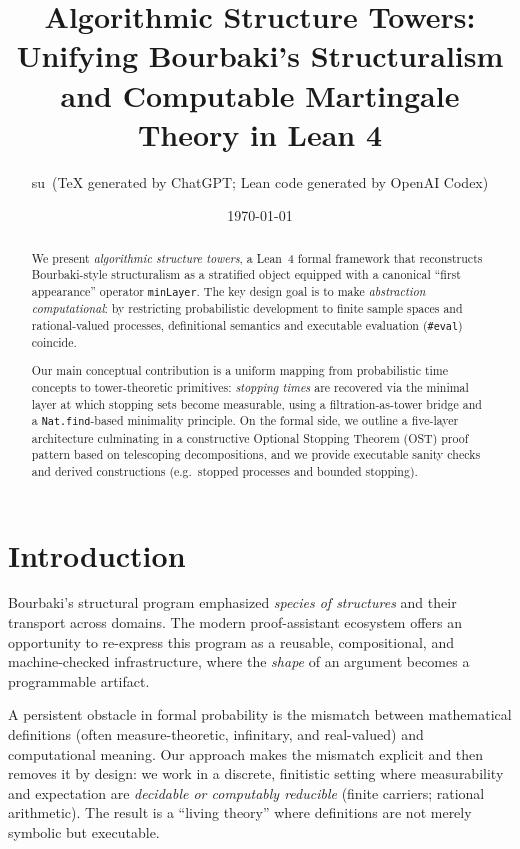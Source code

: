 \documentclass[11pt]{article}
\title{Algorithmic Structure Towers: Unifying Bourbaki's Structuralism and Computable Martingale Theory in Lean 4}
\author{
su\
(TeX generated by ChatGPT; Lean code generated by OpenAI Codex)%
}
\date{\today}
\begin{document}
\maketitle

\begin{abstract}
We present \emph{algorithmic structure towers}, a Lean~4 formal framework that reconstructs Bourbaki-style structuralism as a stratified object equipped with a canonical ``first appearance'' operator \texttt{minLayer}. %
The key design goal is to make \emph{abstraction computational}: by restricting probabilistic development to finite sample spaces and rational-valued processes, definitional semantics and executable evaluation (\texttt{#eval}) coincide.

Our main conceptual contribution is a uniform mapping from probabilistic time concepts to tower-theoretic primitives: \emph{stopping times} are recovered via the minimal layer at which stopping sets become measurable, using a filtration-as-tower bridge and a \texttt{Nat.find}-based minimality principle. %
On the formal side, we outline a five-layer architecture culminating in a constructive Optional Stopping Theorem (OST) proof pattern based on telescoping decompositions, and we provide executable sanity checks and derived constructions (e.g.\ stopped processes and bounded stopping). %
\end{abstract}

\section{Introduction}

Bourbaki's structural program emphasized \emph{species of structures} and their transport across domains. The modern proof-assistant ecosystem offers an opportunity to re-express this program as a reusable, compositional, and machine-checked infrastructure, where the \emph{shape} of an argument becomes a programmable artifact.

A persistent obstacle in formal probability is the mismatch between mathematical definitions (often measure-theoretic, infinitary, and real-valued) and computational meaning. Our approach makes the mismatch explicit and then removes it by design: we work in a discrete, finitistic setting where measurability and expectation are \emph{decidable or computably reducible} (finite carriers; rational arithmetic). The result is a ``living theory'' where definitions are not merely symbolic but executable.
\end{document}
